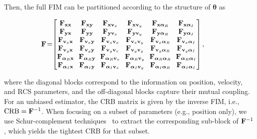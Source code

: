 \documentclass[9pt,final,journal,twocolumn]{IEEEtran}
\begin{document}
Then, the full FIM can be partitioned according to the structure of ${\bm\theta}$ as
\begin{small}
\begin{align}\label{FIM_block_NB}
\hspace*{-1.0em}{\bf F}  
\!=\!&\left[\begin{matrix}  
 {\bf F}_{{\bf x}{\bf x}} \!&\! {\bf F}_{{\bf x}{\bf y}} \!&\! {\bf F}_{{\bf x}{\bf v}_x} \!&\! {\bf F}_{{\bf x}{\bf v}_y} \!&\! {\bf F}_{{\bf x}{\bm\alpha}_R} \!&\! {\bf F}_{{\bf x}{\bm\alpha}_I}  \\
 {\bf F}_{{\bf y}{\bf x}} \!&\! {\bf F}_{{\bf y}{\bf y}} \!&\! {\bf F}_{{\bf y}{\bf v}_x} \!&\! {\bf F}_{{\bf y}{\bf v}_y} \!&\! {\bf F}_{{\bf y}{\bm\alpha}_R} \!&\! {\bf F}_{{\bf y}{\bm\alpha}_I}\\
  {\bf F}_{{\bf v}_x{\bf x}} \!&\! {\bf F}_{{\bf v}_x{\bf y}} \!&\! {\bf F}_{{\bf v}_x{\bf v}_x} \!&\! {\bf F}_{{\bf v}_x{\bf v}_y} \!&\! {\bf F}_{{\bf v}_x{\bm\alpha}_R} \!&\! {\bf F}_{{\bf v}_x{\bm\alpha}_I}\\
  {\bf F}_{{\bf v}_y{\bf x}} \!&\! {\bf F}_{{\bf v}_y{\bf y}} \!&\! {\bf F}_{{\bf v}_y{\bf v}_x} \!&\! {\bf F}_{{\bf v}_y{\bf v}_y} \!&\! {\bf F}_{{\bf v}_y{\bm\alpha}_R} \!&\! {\bf F}_{{\bf v}_y{\bm\alpha}_I}\\
  {\bf F}_{{\bm\alpha}_R{\bf x}} \!&\! {\bf F}_{{\bm\alpha}_R{\bf y}} \!&\! {\bf F}_{{\bm\alpha}_R{\bf v}_x} \!&\! {\bf F}_{{\bm\alpha}_R{\bf v}_y} \!&\! {\bf F}_{{\bm\alpha}_R{\bm\alpha}_R} \!&\! {\bf F}_{{\bm\alpha}_R{\bm\alpha}_I}\\
  {\bf F}_{{\bm\alpha}_I{\bf x}} \!&\! {\bf F}_{{\bm\alpha}_I{\bf y}} \!&\! {\bf F}_{{\bm\alpha}_I{\bf v}_x} \!&\! {\bf F}_{{\bm\alpha}_I{\bf v}_y} \!&\! {\bf F}_{{\bm\alpha}_I{\bm\alpha}_R} \!&\! {\bf F}_{{\bm\alpha}_I{\bm\alpha}_I}\\
    \end{matrix}\right],
\end{align}
\end{small}
\noindent\hspace{-1em} where the diagonal blocks correspond to the information on position, velocity, and RCS parameters, and the off-diagonal blocks capture their mutual coupling. 
For an unbiased estimator, the CRB matrix is given by the inverse FIM, i.e., ${\mathrm {CRB}}={\bf F}^{-1}$. 
When focusing on a subset of parameters (e.g., position only), we use Schur-complement techniques~\cite{dokhanchi2019mmWave} to extract the corresponding sub-block of ${\bf F}^{-1}$, which yields the tightest CRB for that subset.
\end{document}
